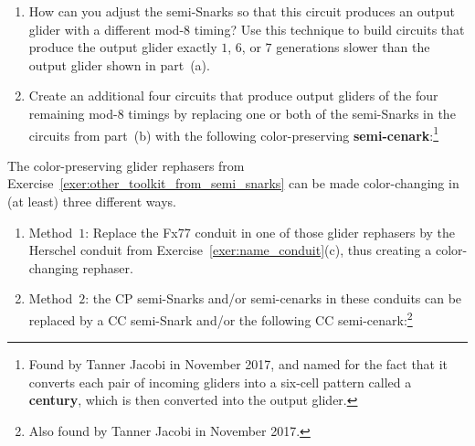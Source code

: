 \begin{multicols}{2}
\begin{problemstar}
\begin{enumerate}[label=\bf\color{ocre}(\alph*)]
			\item How can you adjust the semi-Snarks so that this circuit produces an output glider with a different mod-$8$ timing? Use this technique to build circuits that produce the output glider exactly $1$, $6$, or $7$ generations slower than the output glider shown in part~(a).
			
			\item Create an additional four circuits that produce output gliders of the four remaining mod-$8$ timings by replacing one or both of the semi-Snarks in the circuits from part~(b) with the following color-preserving \textbf{semi-cenark}:\footnote{Found by Tanner Jacobi in November 2017, and named for the fact that it converts each pair of incoming gliders into a six-cell pattern called a \textbf{century}, which is then converted into the output glider.}
			
			\begin{center}
			\end{center}
		\end{enumerate}
	\end{problemstar}


	\mfilbreak
	
	
	\begin{problem}\label{exer:other_cc_toolkit_from_semi_snarks}
		The color-preserving glider rephasers from Exercise~\ref{exer:other_toolkit_from_semi_snarks} can be made color-changing in (at least) three different ways.\smallskip
		
		\begin{enumerate}[label=\bf\color{ocre}(\alph*)]
			\item {} Method~$1$: Replace the Fx77 conduit in one of those glider rephasers by the Herschel conduit from Exercise~\ref{exer:name_conduit}(c), thus creating a color-changing rephaser.
			
			
			\item {} Method~$2$: the CP semi-Snarks and/or semi-cenarks in these conduits can be replaced by a CC semi-Snark and/or the following CC semi-cenark:\footnote{Also found by Tanner Jacobi in November 2017.}
			
			\begin{center}
			\end{center}
		

\end{enumerate}
\end{problem}
\end{multicols}
